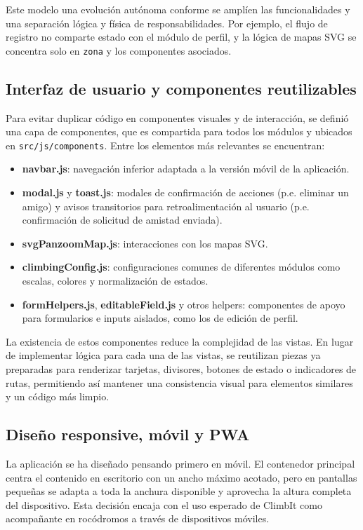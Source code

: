 Este modelo una evolución autónoma conforme se amplíen las funcionalidades y una separación lógica y física de responsabilidades. Por ejemplo, el flujo de registro no comparte estado con el módulo de perfil, y la lógica de mapas SVG se concentra solo en \texttt{zona} y los componentes asociados.

\subsection{Interfaz de usuario y componentes reutilizables}

Para evitar duplicar código en componentes visuales y de interacción, se definió una capa de componentes, que es compartida para todos los módulos y ubicados en \texttt{src/js/components}. Entre los elementos más relevantes se encuentran:

\begin{itemize}
  \item \textbf{navbar.js}: navegación inferior adaptada a la versión móvil de la aplicación.
  \item \textbf{modal.js} y \textbf{toast.js}: modales de confirmación de acciones (p.e. eliminar un amigo) y avisos transitorios para retroalimentación al usuario (p.e. confirmación de solicitud de amistad enviada).
  \item \textbf{svgPanzoomMap.js}: interacciones con los mapas SVG.
  \item \textbf{climbingConfig.js}: configuraciones comunes de diferentes módulos como escalas, colores y normalización de estados.
  \item \textbf{formHelpers.js}, \textbf{editableField.js} y otros helpers: componentes de apoyo para formularios e inputs aislados, como los de edición de perfil.
\end{itemize}

La existencia de estos componentes reduce la complejidad de las vistas. En lugar de implementar lógica para cada una de las vistas, se reutilizan piezas ya preparadas para renderizar tarjetas, divisores, botones de estado o indicadores de rutas, permitiendo así mantener una consistencia visual para elementos similares y un código más limpio.

\subsection{Diseño responsive, móvil y PWA}

La aplicación se ha diseñado pensando primero en móvil. El contenedor principal centra el contenido en escritorio con un ancho máximo acotado, pero en pantallas pequeñas se adapta a toda la anchura disponible y aprovecha la altura completa del dispositivo. Esta decisión encaja con el uso esperado de ClimbIt como acompañante en rocódromos a través de dispositivos móviles.

